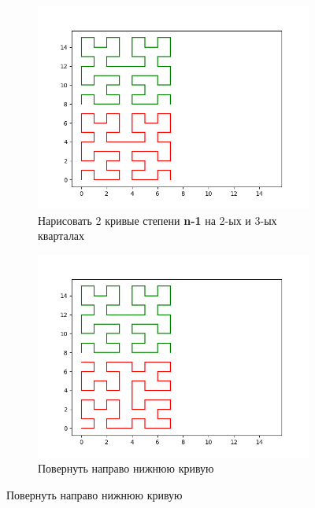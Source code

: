 \documentclass[12pt]{article} %
\begin{document}
\begin{figure}[H]

\begin{subfigure}[1]{0.45\textwidth}
\centering \includegraphics[width = \textwidth]{hilbert4step1.png}
\caption{Нарисовать 2 кривые степени \textbf{n-1} на 2-ых и 3-ых кварталах}
\end{subfigure}
\hfill
\begin{subfigure}[1]{0.45\textwidth}
\centering \includegraphics[width = \textwidth]{hilbert4step2.png}
\caption{Повернуть направо нижнюю кривую}
\end{subfigure}


\end{figure}
\end{document}
